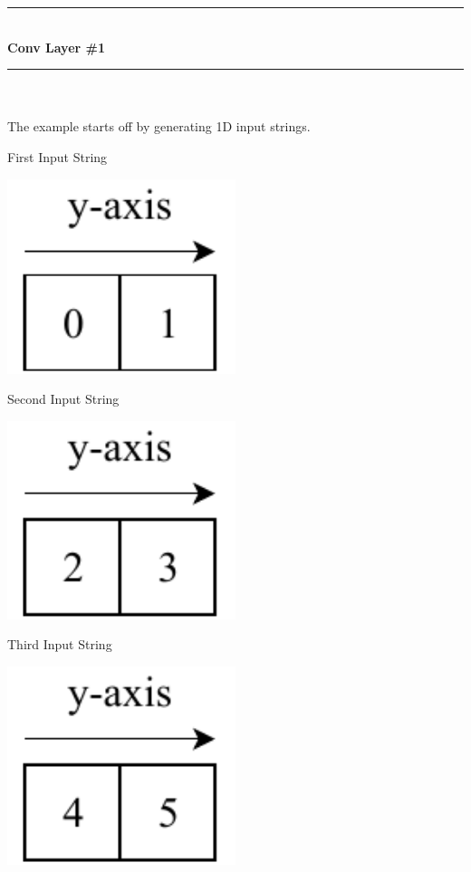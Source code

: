 \documentclass[a4paper, 12pt]{report}
\newcommand\tab[1][1cm]{\hspace*{#1}}
\begin{document}
\newpage
	{
		
		\color{blue-primary-alt} 
		\rule{2.1cm}{0.4mm}\\[0.2cm]
		\textbf{Conv Layer \#1}\\
		\rule{2.1cm}{0.4mm}
	}\\\\
\tab The example starts off by generating 1D input strings.\\
\begin{tcbraster}[raster columns=3,raster rows=1,
	enhanced,size=small,fit algorithm=hybrid* ]
	\begin{inlinefigure}{First Input String}
		\begin{center}
			\includegraphics[width=0.5\textwidth]{input1}
		\end{center}
	\end{inlinefigure}
	\begin{inlinefigure}{Second Input String}
		\begin{center}
			\includegraphics[width=0.5\textwidth]{input2}
		\end{center}
	\end{inlinefigure}
	\begin{inlinefigure}{Third Input String}
		\begin{center}
			\includegraphics[width=0.5\textwidth]{input3}
		\end{center}
	\end{inlinefigure}
\end{tcbraster}
\end{document}
